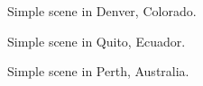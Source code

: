 \documentclass[twocolumn,10pt]{asme2ej}
\begin{document}
\begin{figure}[h!]
\begin{center}
\end{center}
\caption{Simple scene in Denver, Colorado.}
\label{fig:scene1}
\end{figure}

\begin{figure}[h!]
\begin{center}
\end{center}
\caption{Simple scene in Quito, Ecuador.}
\label{fig:scene2}
\end{figure}

\begin{figure}[h!]
\begin{center}
\end{center}
\caption{Simple scene in Perth, Australia.}
\label{fig:scene3}
\end{figure}
\end{document}
